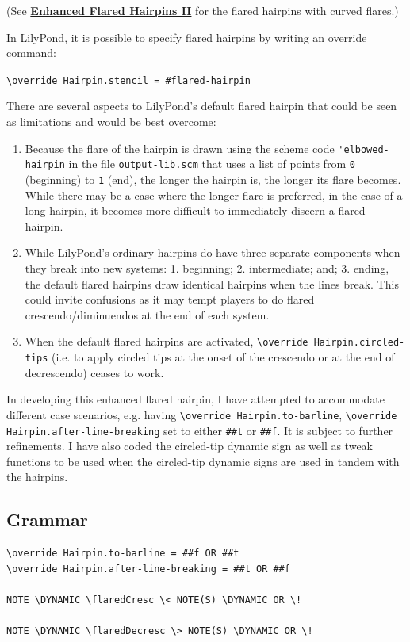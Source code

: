 (See \hyperref[sec:enhanced_flared_hairpins_2]{\textbf{Enhanced Flared Hairpins II}} for the flared hairpins with curved flares.)

In LilyPond, it is possible to specify flared hairpins by writing an override command: 

\verb|\override Hairpin.stencil = #flared-hairpin|

There are several aspects to LilyPond's default flared hairpin that could be seen as limitations and would be best overcome:

\begin{enumerate}

\item Because the flare of the hairpin is drawn using the scheme code \verb|'elbowed-hairpin| in the file \verb|output-lib.scm| that uses a list of points from \verb|0| (beginning) to \verb|1| (end), the longer the hairpin is, the longer its flare becomes. While there may be a case where the longer flare is preferred, in the case of a long hairpin, it becomes more difficult to immediately discern a flared hairpin.
\item While LilyPond's ordinary hairpins do have three separate components when they break into new systems: 1. beginning; 2. intermediate; and; 3. ending, the default flared hairpins draw identical  hairpins when the lines break. This could invite confusions as it may tempt players to do flared crescendo/diminuendos at the end of each system.
\item When the default flared hairpins are activated, \verb|\override Hairpin.circled-tips| (i.e. to apply circled tips at the onset of the crescendo or at the end of decrescendo) ceases to work.   

\end{enumerate}

In developing this enhanced flared hairpin, I have attempted to accommodate different case scenarios, e.g. having \verb|\override Hairpin.to-barline|, \verb|\override Hairpin.after-line-breaking| set to either \verb|##t| or  \verb|##f|. It is subject to further refinements. I have also coded the circled-tip dynamic sign as well as tweak functions to be used when the circled-tip dynamic signs are used in tandem with the hairpins.

\subsection{Grammar}
\begin{verbatim}
\override Hairpin.to-barline = ##f OR ##t
\override Hairpin.after-line-breaking = ##t OR ##f

NOTE \DYNAMIC \flaredCresc \< NOTE(S) \DYNAMIC OR \!

NOTE \DYNAMIC \flaredDecresc \> NOTE(S) \DYNAMIC OR \!
\end{verbatim}

